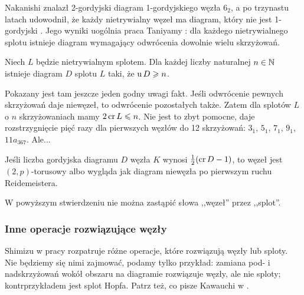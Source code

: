 Nakanishi \cite{nakanishi1983} znalazł 2-gordyjski diagram 1-gordyjskiego węzła $6_2$, a po trzynastu latach udowodnił, że każdy nietrywialny węzeł ma diagram, który nie jest 1-gordyjski \cite{nakanishi1996}.
%
Jego wyniki uogólnia praca Taniyamy \cite{taniyama2009}: dla każdego nietrywialnego splotu istnieje diagram wymagający odwrócenia dowolnie wielu skrzyżowań.
%

\begin{proposition}
    Niech $L$ będzie nietrywialnym splotem.
    Dla każdej liczby naturalnej $n \in \mathbb N$ istnieje diagram $D$ splotu $L$ taki, że $\operatorname{u} D \geqslant n$.
\end{proposition}

Pokazany jest tam jeszcze jeden godny uwagi fakt.
Jeśli odwrócenie pewnych skrzyżowań daje niewęzeł, to odwrócenie pozostałych także.
Zatem dla splotów $L$ o $n$ skrzyżowaniach mamy $2 \operatorname{cr} L \leqslant n$.
Nie jest to zbyt pomocne, daje rozstrzygnięcie pięć razy dla pierwszych węzłów do 12 skrzyżowań: $3_{1}$, $5_{1}$, $7_{1}$, $9_{1}$, $11a_{367}$.
Ale...

\begin{proposition}
    Jeśli liczba gordyjska diagramu $D$ węzła $K$ wynosi $\frac 12 (\operatorname{cr} D - 1)$, to węzeł jest $(2,p)$-torusowy albo wygląda jak diagram niewęzła po pierwszym ruchu Reidemeistera.
\end{proposition}

W powyższym stwierdzeniu nie można zastąpić słowa ,,węzeł'' przez ,,splot''.











\subsubsection{Inne operacje rozwiązujące węzły}

Shimizu w pracy \cite{shimizu2014} rozpatruje różne operacje, które rozwiązują węzły lub sploty.
%
Nie będziemy się nimi zajmować, podamy tylko przykład: zamiana pod- i nadskrzyżowań wokół obszaru na diagramie rozwiązuje węzły, ale nie sploty; kontrprzykładem jest splot Hopfa.
%
Patrz też, co pisze Kawauchi w \cite[s. 141-154]{kawauchi1996}.

